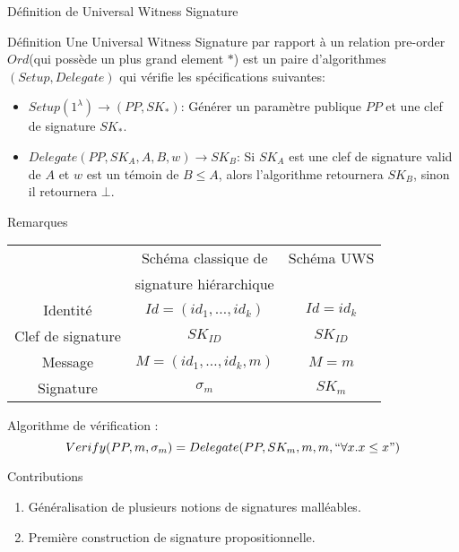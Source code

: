 \begin{frame}{D\'efinition de Universal Witness Signature}
  \begin{block}{D\'efinition}
    Une Universal Witness Signature par rapport \`a un relation pre-order $Ord$(qui poss\`ede un plus grand element $*$) est un paire  d'algorithmes $(Setup, Delegate)$ qui v\'erifie les sp\'ecifications suivantes:
    \begin{itemize}
    \item $Setup(1^\lambda) \to (PP,SK_*)$: G\'en\'erer un param\`etre publique $PP$ et une clef de signature $SK_*$.
    \item $Delegate(PP, SK_A, A, B, w) \to SK_B$: Si $SK_A$ est une clef de signature valid de $A$ et $w$ est un t\'emoin de $B\leq A$, alors l'algorithme retournera $SK_B$, sinon il retournera $\bot$.
    \end{itemize}
  \end{block}
\end{frame}

\begin{frame}{Remarques}

  \begin{tabular}{|c|c|c|}
    \hline
    & Sch\'ema classique de  & Sch\'ema UWS\\
    & signature hi\'erarchique & \\
    \hline
    Identit\'e  & $Id = (id_1, \dots, id_k)$ & $Id = id_k$\\
    \hline
    Clef de signature &  $SK_{ID}$ & $SK_{ID}$\\
    \hline
    Message  & $M = (id_1, \dots, id_k, m)$ & $M = m$ \\
    \hline
    Signature & $\sigma_m$ & $SK_m$\\
    \hline
  \end{tabular}

  \begin{block}{}
    Algorithme de v\'erification :
    $$Verify(PP, m, \sigma_m)  =  Delegate(PP,SK_m,m,m, ``\forall x. x\leq x")$$
  \end{block}
\end{frame}


\begin{frame}{Contributions}
  \begin{enumerate}
  \item G\'en\'eralisation de plusieurs notions de signatures mall\'eables.
  \item Premi\`ere construction de signature propositionnelle.
  \end{enumerate}

\end{frame}